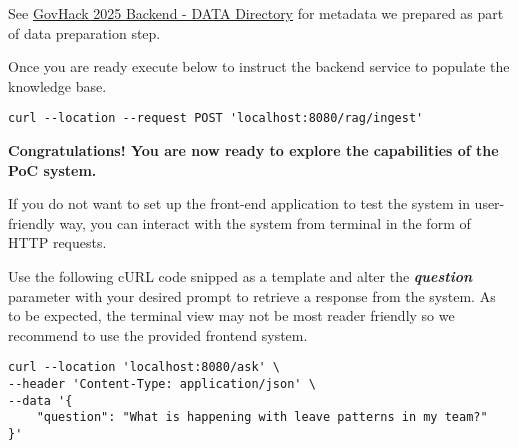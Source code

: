 See \href{https://github.com/AyeshJayasekara/GovHack-2025-Backend/tree/main/DATA}{GovHack 2025 Backend - DATA Directory} for metadata we
prepared as part of data preparation step.

Once you are ready execute below to instruct the backend service to populate the knowledge base.

\begin{lstlisting}
curl --location --request POST 'localhost:8080/rag/ingest'
\end{lstlisting}


\textbf{Congratulations! You are now ready to explore the capabilities of the PoC system.}

\clearpage

If you do not want to set up the front-end application to test the system in user-friendly way,
you can interact with the system from terminal in the form of HTTP requests.

Use the following cURL code snipped as a template and alter the \textbf{\emph{question}} parameter with your desired prompt to retrieve a response from the system.
As to be expected, the terminal view may not be most reader friendly so we recommend to use the provided frontend system.

\begin{lstlisting}
curl --location 'localhost:8080/ask' \
--header 'Content-Type: application/json' \
--data '{
    "question": "What is happening with leave patterns in my team?"
}'\end{lstlisting}
